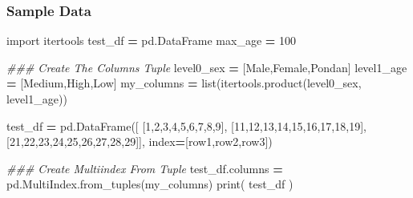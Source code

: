 \documentclass[
]{book}
\newenvironment{Shaded}{\begin{snugshade}}{\end{snugshade}}
\newcommand{\BuiltInTok}[1]{#1}
\newcommand{\CommentTok}[1]{\textcolor[rgb]{0.37,0.37,0.37}{\textit{#1}}}
\newcommand{\DecValTok}[1]{\textcolor[rgb]{0.06,0.06,0.06}{#1}}
\newcommand{\ImportTok}[1]{#1}
\newcommand{\NormalTok}[1]{#1}
\newcommand{\OperatorTok}[1]{\textcolor[rgb]{0.43,0.43,0.43}{\textbf{#1}}}
\newcommand{\StringTok}[1]{\textcolor[rgb]{0.5,0.5,0.5}{#1}}
\begin{document}
\hypertarget{sample-data-11}{%
\subsubsection{Sample Data}\label{sample-data-11}}

\begin{Shaded}
\begin{Highlighting}[]
\ImportTok{import}\NormalTok{ itertools}
\NormalTok{test\_df }\OperatorTok{=}\NormalTok{ pd.DataFrame}
\NormalTok{max\_age }\OperatorTok{=} \DecValTok{100}

\CommentTok{\#\#\# Create The Columns Tuple}
\NormalTok{level0\_sex }\OperatorTok{=}\NormalTok{ [}\StringTok{\textquotesingle{}Male\textquotesingle{}}\NormalTok{,}\StringTok{\textquotesingle{}Female\textquotesingle{}}\NormalTok{,}\StringTok{\textquotesingle{}Pondan\textquotesingle{}}\NormalTok{]}
\NormalTok{level1\_age }\OperatorTok{=}\NormalTok{ [}\StringTok{\textquotesingle{}Medium\textquotesingle{}}\NormalTok{,}\StringTok{\textquotesingle{}High\textquotesingle{}}\NormalTok{,}\StringTok{\textquotesingle{}Low\textquotesingle{}}\NormalTok{]}
\NormalTok{my\_columns }\OperatorTok{=} \BuiltInTok{list}\NormalTok{(itertools.product(level0\_sex, level1\_age))}

\NormalTok{test\_df }\OperatorTok{=}\NormalTok{ pd.DataFrame([}
\NormalTok{             [}\DecValTok{1}\NormalTok{,}\DecValTok{2}\NormalTok{,}\DecValTok{3}\NormalTok{,}\DecValTok{4}\NormalTok{,}\DecValTok{5}\NormalTok{,}\DecValTok{6}\NormalTok{,}\DecValTok{7}\NormalTok{,}\DecValTok{8}\NormalTok{,}\DecValTok{9}\NormalTok{],}
\NormalTok{             [}\DecValTok{11}\NormalTok{,}\DecValTok{12}\NormalTok{,}\DecValTok{13}\NormalTok{,}\DecValTok{14}\NormalTok{,}\DecValTok{15}\NormalTok{,}\DecValTok{16}\NormalTok{,}\DecValTok{17}\NormalTok{,}\DecValTok{18}\NormalTok{,}\DecValTok{19}\NormalTok{],}
\NormalTok{             [}\DecValTok{21}\NormalTok{,}\DecValTok{22}\NormalTok{,}\DecValTok{23}\NormalTok{,}\DecValTok{24}\NormalTok{,}\DecValTok{25}\NormalTok{,}\DecValTok{26}\NormalTok{,}\DecValTok{27}\NormalTok{,}\DecValTok{28}\NormalTok{,}\DecValTok{29}\NormalTok{]], index}\OperatorTok{=}\NormalTok{[}\StringTok{\textquotesingle{}row1\textquotesingle{}}\NormalTok{,}\StringTok{\textquotesingle{}row2\textquotesingle{}}\NormalTok{,}\StringTok{\textquotesingle{}row3\textquotesingle{}}\NormalTok{])}

\CommentTok{\#\#\# Create Multiindex From Tuple}
\NormalTok{test\_df.columns }\OperatorTok{=}\NormalTok{ pd.MultiIndex.from\_tuples(my\_columns)}
\BuiltInTok{print}\NormalTok{( test\_df ) }
\end{Highlighting}
\end{Shaded}
\end{document}
